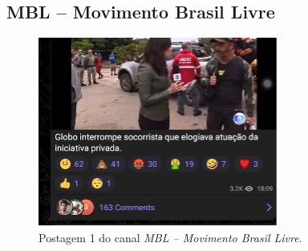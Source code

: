 \documentclass[portuguese]{textolivre}
\begin{document}
\subsection{MBL -- Movimento Brasil Livre}

\begin{figure}[h!]
    \centering
    \begin{minipage}[t]{0.3\textwidth}
        \centering
        \includegraphics[width=\linewidth]{Imagens/Fig18.png}
        \caption{Postagem 1 do canal \emph{MBL -- Movimento Brasil Livre}.}
        \label{fig-18}
    \end{minipage}
    \hfill
    \begin{minipage}[t]{0.3\textwidth}
        \centering

\end{minipage}
\end{figure}
\end{document}
